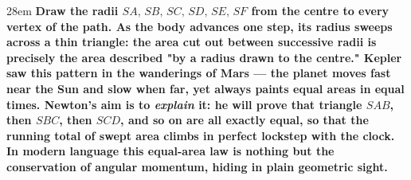 \documentclass[border=4pt]{standalone}
\begin{document}
\begin{varwidth}{28em}
\large\bfseries
Draw the radii $SA,\,SB,\,SC,\,SD,\,SE,\,SF$ from the centre to every vertex of the path.      As the body advances one step, its radius sweeps across a thin triangle: the area cut out between      successive radii is precisely the area described "by a radius drawn to the centre." Kepler saw this pattern      in the wanderings of Mars — the planet moves fast near the Sun and slow when far, yet always paints equal      areas in equal times. Newton's aim is to \emph{explain} it: he will prove that triangle $SAB$, then $SBC$,      then $SCD$, and so on are all exactly equal, so that the running total of swept area climbs in      perfect lockstep with the clock. In modern language this equal-area law is nothing but the conservation of      angular momentum, hiding in plain geometric sight.
\end{varwidth}
\end{document}
